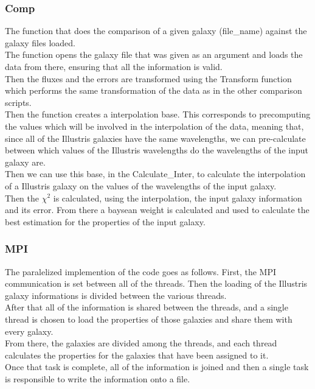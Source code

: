 \documentclass[11pt]{article}
\begin{document}
\subsubsection{Comp}

The function that does the comparison of a given galaxy (file\_name) against the galaxy files loaded.\\

The function opens the galaxy file that was given as an argument and loads the data from there, ensuring that all the information is valid.\\

Then the fluxes and the errors are transformed using the Transform function which performs the same transformation of the data as in the other comparison scripts.\\

Then the function creates a interpolation base. This corresponds to precomputing the values which will be involved in the interpolation of the data, meaning that, since all of the Illustris galaxies have the same wavelengths, we can pre-calculate between which values of the Illustris wavelengths do the wavelengths of the input galaxy are.\\

Then we can use this base, in the Calculate\_Inter, to calculate the interpolation of a Illustris galaxy on the values of the wavelengths of the input galaxy.\\

Then the $\chi^2$ is calculated, using the interpolation, the input galaxy information and its error. From there a baysean weight is calculated and used to calculate the best estimation for the properties of the input galaxy.

\subsubsection{MPI}

The paralelized implemention of the code goes as follows. First, the MPI communication is set between all of the threads. Then the loading of the Illustris galaxy informations is divided between the various threads.\\

After that all of the information is shared between the threads, and a single thread is chosen to load the properties of those galaxies and share them with every galaxy.\\

From there, the galaxies are divided among the threads, and each thread calculates the properties for the galaxies that have been assigned to it.\\

Once that task is complete, all of the information is joined and then a single task is responsible to write the information onto a file. 
\end{document}
